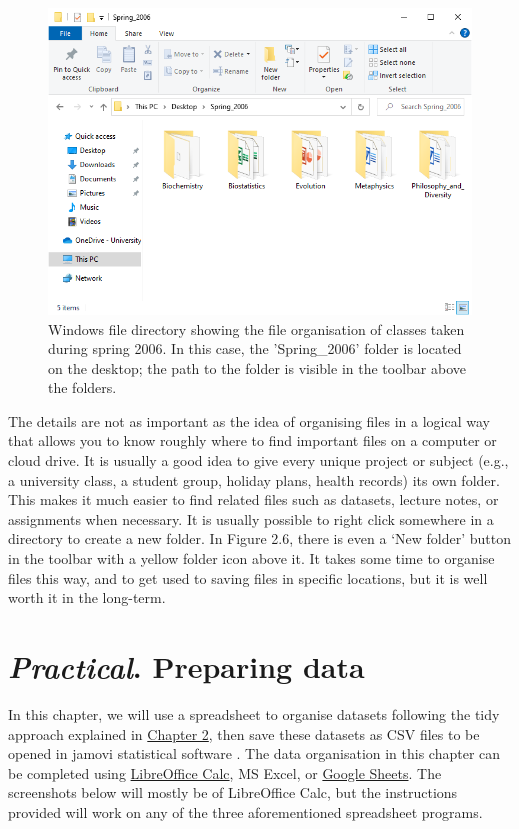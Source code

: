 \documentclass[
  openany]{scrbook}
\begin{document}
\begin{figure}
\includegraphics[width=1\linewidth]{img/directory_windows} \caption{Windows file directory showing the file organisation of classes taken during spring 2006. In this case, the 'Spring\_2006' folder is located on the desktop; the path to the folder is visible in the toolbar above the folders.}\label{fig:unnamed-chunk-8}
\end{figure}

The details are not as important as the idea of organising files in a logical way that allows you to know roughly where to find important files on a computer or cloud drive.
It is usually a good idea to give every unique project or subject (e.g., a university class, a student group, holiday plans, health records) its own folder.
This makes it much easier to find related files such as datasets, lecture notes, or assignments when necessary.
It is usually possible to right click somewhere in a directory to create a new folder.
In Figure 2.6, there is even a `New folder' button in the toolbar with a yellow folder icon above it.
It takes some time to organise files this way, and to get used to saving files in specific locations, but it is well worth it in the long-term.

\hypertarget{Chapter_3}{%
\chapter{\texorpdfstring{\emph{Practical}. Preparing data}{Practical. Preparing data}}\label{Chapter_3}}

In this chapter, we will use a spreadsheet to organise datasets following the tidy approach explained in \protect\hyperlink{Chapter_2}{Chapter 2}, then save these datasets as CSV files to be opened in jamovi statistical software \citep{Jamovi2022}.
The data organisation in this chapter can be completed using \href{https://www.libreoffice.org/discover/calc/}{LibreOffice Calc}, MS Excel, or \href{https://docs.google.com/spreadsheets/}{Google Sheets}.
The screenshots below will mostly be of LibreOffice Calc, but the instructions provided will work on any of the three aforementioned spreadsheet programs.
\end{document}
